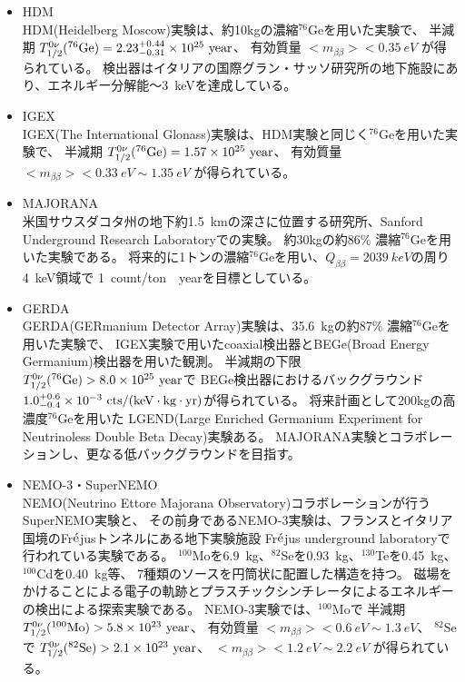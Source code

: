 \documentclass[a4paper,10pt]{jreport}
\begin{document}
\begin{itemize}

	\item HDM \\
	HDM(Heidelberg Moscow)実験は、約10kgの濃縮$^{76}$Geを用いた実験で、
	半減期 $T_{1/2}^{0\nu}(^{76}\rm{Ge}) = 2.23 ^{+0.44} _{-0.31} \times 10^{25} \ \rm{year}$、
	有効質量 $< m_{\beta\beta} > < \SI{0.35}{eV}$
	が得られている。
	検出器はイタリアの国際グラン・サッソ研究所の地下施設にあり、エネルギー分解能〜\SI{3}{keV}を達成している。
	\cite{HDM}
	
	\item IGEX \\
	IGEX(The International Glonass)実験は、HDM実験と同じく$^{76}$Geを用いた実験で、
	半減期 $T_{1/2}^{0\nu}(^{76}\rm{Ge}) = 1.57 \times 10^{25} \ \rm{year}$、
	有効質量 $< m_{\beta\beta} > < \SI{0.33}{eV} \sim \SI{1.35}{eV}$
	が得られている。
	
	\item MAJORANA \\
	米国サウスダコタ州の地下約\SI{1.5}{km}の深さに位置する研究所、Sanford Underground Research Laboratoryでの実験。
	約30kgの約86\% 濃縮$^{76}$Geを用いた実験である。
	将来的に1トンの濃縮$^{76}$Geを用い、$Q_{\beta\beta}=\SI{2039}{keV}$の周り\SI{4}{keV}領域で
	\SI{1}{count/ton \cdot year}を目標としている。
	\cite{MAJORANA}
	
	\item GERDA \\
	GERDA(GERmanium Detector Array)実験は、\SI{35.6}{kg}の約87\% 濃縮$^{76}$Geを用いた実験で、
	IGEX実験で用いたcoaxial検出器とBEGe(Broad Energy Germanium)検出器を用いた観測。
	半減期の下限 $T_{1/2}^{0\nu}(^{76}\rm{Ge}) > 8.0 \times 10^{25} \ \rm{year}$で
	BEGe検出器におけるバックグラウンド$1.0 ^{+0.6} _{-0.4} \times 10^{-3} \ \rm{cts/(keV \cdot kg \cdot yr)}$が得られている。
	将来計画として200kgの高濃度$^{76}$Geを用いた
	LGEND(Large Enriched Germanium Experiment for Neutrinoless Double Beta Decay)実験ある。
	MAJORANA実験とコラボレーションし、更なる低バックグラウンドを目指す。
	\cite{GERDA}
	
	\item NEMO-3・SuperNEMO \\
	NEMO(Neutrino Ettore Majorana Observatory)コラボレーションが行うSuperNEMO実験と、
	その前身であるNEMO-3実験は、フランスとイタリア国境のFr$\acute{\rm{e}}$jusトンネルにある地下実験施設
	Fr$\acute{\rm{e}}$jus underground laboratoryで行われている実験である。
	$^{100}$Moを\SI{6.9}{kg}、$^{82}$Seを\SI{0.93}{kg}、$^{130}$Teを\SI{0.45}{kg}、$^{100}$Cdを\SI{0.40}{kg}等、
	7種類のソースを円筒状に配置した構造を持つ。
	磁場をかけることによる電子の軌跡とプラスチックシンチレータによるエネルギーの検出による探索実験である。
	NEMO-3実験では、$^{100}$Moで
	半減期 $T_{1/2}^{0\nu}(^{100}\rm{Mo}) > 5.8 \times 10^{23} \ \rm{year}$、
	有効質量 $< m_{\beta\beta} > < \SI{0.6}{eV} \sim \SI{1.3}{eV}$、
	$^{82}$Seで
	$T_{1/2}^{0\nu}(^{82}\rm{Se}) > 2.1 \times 10^{23} \ \rm{year}$、
	$< m_{\beta\beta} > < \SI{1.2}{eV} \sim \SI{2.2}{eV}$
	が得られている。
	\cite{NEMO}
	

\end{itemize}
\end{document}
